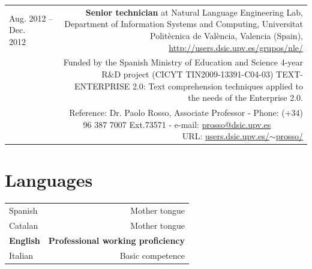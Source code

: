 \documentclass[10pt]{article}
\begin{document}
\begin{tabular}{L!{\VRule}R}
Aug. 2012 -- Dec. 2012~~~~&{\textbf{Senior technician} at Natural Language Engineering Lab, Department of Information Systems and Computing, Universitat Polit{\`e}cnica de 
Val{\`e}ncia, Valencia (Spain), \url{http://users.dsic.upv.es/grupos/nle/}}\\
&\scriptsize{Funded by the Spanish Ministry of Education and Science 4-year R\&D project (CICYT TIN2009-13391-C04-03) TEXT-ENTERPRISE 2.0: Text comprehension techniques
applied to the needs of the Enterprise 2.0.}\\
&\scriptsize{Reference: Dr. Paolo Rosso, Associate Professor - Phone: (+34) 96 387 7007 Ext.73571 - e-mail: \href{mailto:prosso@dsic.upv.es}{prosso@dsic.upv.es} ~~~~~~~ URL: \href{http://users.dsic.upv.es/~prosso/}{users.dsic.upv.es/$\sim$prosso/}}\\
\end{tabular}

\section*{Languages}
\begin{tabular}{L!{\VRule}R}
Spanish&Mother tongue\\
Catalan&Mother tongue\\
{\bf English}&{\bf Professional working proficiency}\\
Italian&Basic competence\\
\end{tabular}
\end{document}
